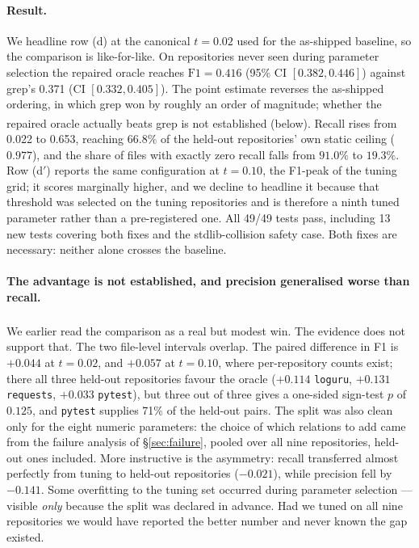 \documentclass[sigconf,review,anonymous]{acmart}
\newcommand{\corr}{\textsuperscript{\dag}}
\begin{document}
\paragraph{Result.} We headline row (d) at the canonical $t{=}0.02$ used for the as-shipped baseline, so the
comparison is like-for-like. On repositories never seen during parameter selection the repaired oracle reaches
$\mathrm{F1}=0.416$ (95\% CI $[0.382, 0.446]$) against grep's 0.371 (CI $[0.332, 0.405]$). The point
estimate reverses the as-shipped ordering, in which grep won by roughly an order of magnitude; whether
the repaired oracle actually beats grep is not established (below)\corr{}. Recall rises from 0.022 to 0.653,
reaching $66.8\%$ of the held-out repositories' own static ceiling ($0.977$), and the share of files with
exactly zero recall falls from $91.0\%$ to $19.3\%$. Row (d$'$) reports the same configuration at
$t{=}0.10$, the F1-peak of the tuning grid; it scores marginally higher, and we decline to headline it
because that threshold was selected on the tuning repositories and is therefore a ninth tuned parameter
rather than a pre-registered one. All 49/49 tests pass, including 13 new tests covering
both fixes and the stdlib-collision safety case. Both fixes are necessary: neither alone crosses the
baseline.

\paragraph{The advantage is not established, and precision generalised worse than recall.} We
earlier read the comparison as a real but modest win\corr{}. The evidence does not support that.
The two file-level intervals overlap. The paired difference in F1 is $+0.044$ at $t{=}0.02$, and
$+0.057$ at $t{=}0.10$, where per-repository counts exist; there all three held-out repositories
favour the oracle ($+0.114$ \texttt{loguru}, $+0.131$ \texttt{requests}, $+0.033$ \texttt{pytest}),
but three out of three gives a one-sided sign-test $p$ of $0.125$, and \texttt{pytest} supplies
71\% of the held-out pairs. The split was also clean only for the eight numeric parameters: the
choice of which relations to add came from the failure analysis of \S\ref{sec:failure}, pooled
over all nine repositories, held-out ones included. More instructive is the asymmetry: recall transferred almost perfectly from tuning to held-out repositories
($-0.021$), while precision fell by $-0.141$. Some overfitting to the tuning set occurred during
parameter selection --- visible \emph{only} because the split was declared in advance. Had we tuned on
all nine repositories we would have reported the better number and never known the gap existed.
\end{document}
